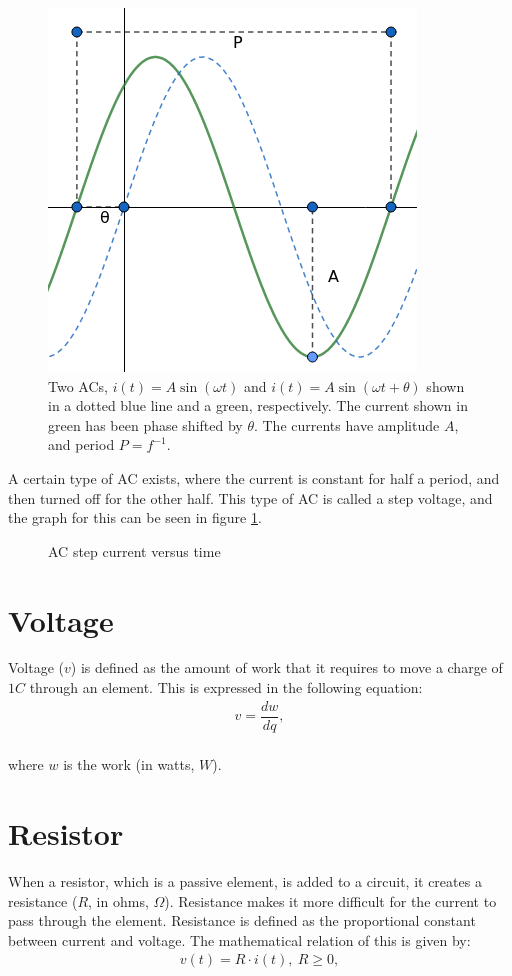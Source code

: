 \begin{figure}[H]
	\centering
	\includegraphics[scale=0.6]{fig/img/AC.png}
	\caption{Two ACs, $i(t)=A\sin(\omega t)$ and $i(t)=A\sin(\omega t+\theta)$ shown in a dotted blue line and a green, respectively. The current shown in green has been phase shifted by $\theta$. The currents have amplitude $A$, and period $P=f^{-1}$.}
\end{figure}
\noindent A certain type of AC exists, where the current is constant for half a period, and then turned off for the other half. This type of AC is called a step voltage, and the graph for this can be seen in figure \ref{fig:AC_step}.
\begin{figure}[H] 

\caption{AC step current versus time}
\label{fig:AC_step}
\end{figure}
\section{Voltage}
Voltage ($v$) is defined as the amount of work that it requires to move a charge of $1 C$ through an element. This is expressed in the following equation: \cite[p. 8]{bcircuit}
\begin{align*}
	v=\dfrac{dw}{dq},
\end{align*}
\\
where $w$ is the work (in watts, $W$).
\section{Resistor}
When a resistor, which is a passive element, is added to a circuit, it creates a resistance ($R$, in ohms, $\Omega$). Resistance makes it more difficult for the current to pass through the element. Resistance is defined as the proportional constant between current and voltage. The mathematical relation of this is given by: \cite[p.~22]{bcircuit5}
\begin{align} 
\label{Ohm}
v(t)=R\cdot i(t),\ R\geq0,
\end{align}
